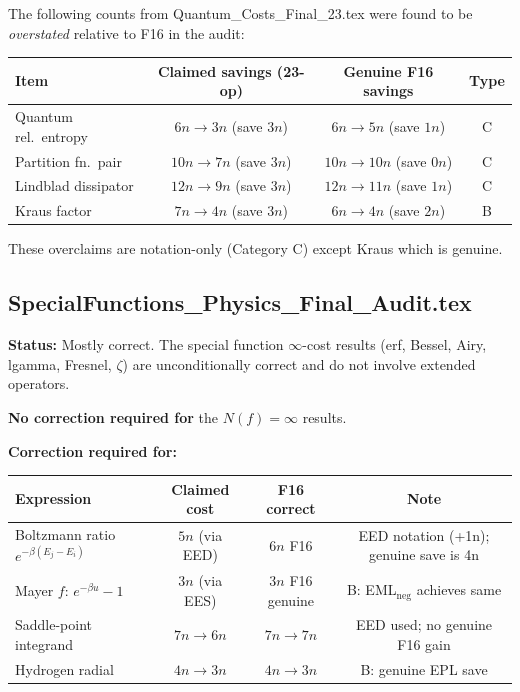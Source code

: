 \documentclass[11pt]{article}
\begin{document}
The following counts from Quantum\_Costs\_Final\_23.tex were found to be
\emph{overstated} relative to F16 in the audit:
\begin{center}
\renewcommand{\arraystretch}{1.2}
\begin{tabular}{lccc}
\toprule
Item & Claimed savings (23-op) & Genuine F16 savings & Type \\
\midrule
Quantum rel.\ entropy & $6n \to 3n$ (save $3n$) & $6n \to 5n$ (save $1n$) & C \\
Partition fn.\ pair & $10n \to 7n$ (save $3n$) & $10n \to 10n$ (save $0n$) & C \\
Lindblad dissipator & $12n \to 9n$ (save $3n$) & $12n \to 11n$ (save $1n$) & C \\
Kraus factor & $7n \to 4n$ (save $3n$) & $6n \to 4n$ (save $2n$) & B \\
\bottomrule
\end{tabular}
\end{center}
These overclaims are notation-only (Category C) except Kraus which is genuine.

\subsection{SpecialFunctions\_Physics\_Final\_Audit.tex}

\textbf{Status:} Mostly correct. The special function $\infty$-cost results
(erf, Bessel, Airy, lgamma, Fresnel, $\zeta$) are unconditionally correct and
do not involve extended operators.

\textbf{No correction required for} the $N(f) = \infty$ results.

\textbf{Correction required for:}
\begin{center}
\renewcommand{\arraystretch}{1.2}
\begin{tabular}{lccc}
\toprule
Expression & Claimed cost & F16 correct & Note \\
\midrule
Boltzmann ratio $e^{-\beta(E_j - E_i)}$ & $5n$ (via EED) & $6n$ F16 & EED notation (+1n); genuine save is 4n \\
Mayer $f$: $e^{-\beta u}-1$ & $3n$ (via EES) & $3n$ F16 genuine & B: EML$_\mathrm{neg}$ achieves same \\
Saddle-point integrand & $7n \to 6n$ & $7n \to 7n$ & EED used; no genuine F16 gain \\
Hydrogen radial & $4n \to 3n$ & $4n \to 3n$ & B: genuine EPL save \\
\bottomrule
\end{tabular}
\end{center}
\end{document}
